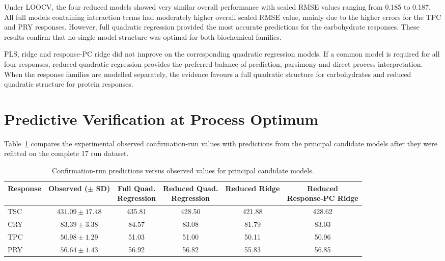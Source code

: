\documentclass[MScDSA]{uccthesis}
\begin{document}
Under LOOCV, the four reduced models showed very similar overall performance with scaled RMSE values ranging from 0.185 to 0.187. All full models containing interaction terms had moderately higher overall scaled RMSE value, mainly due to the higher errors for the TPC and PRY responses. However, full quadratic regression provided the most accurate predictions for the carbohydrate responses. These results confirm that no single model structure was optimal for both biochemical families.

PLS, ridge and response-PC ridge did not improve on the corresponding quadratic regression models. If a common model is required for all four responses, reduced quadratic regression provides the preferred balance of prediction, parsimony and direct process interpretation. When the response families are modelled separately, the evidence favours a full quadratic structure for carbohydrates and reduced quadratic structure for protein responses.

\section{Predictive Verification at Process Optimum}
\label{sec:confirmation_predictions}
Table~\ref{tab:confirmation_predictions} compares the experimental observed confirmation-run values with predictions from the principal candidate models after they were refitted on the complete 17 run dataset.

\begin{table}[H]
\centering
\fontsize{10}{12}\selectfont
\setlength{\tabcolsep}{4pt}
\caption{Confirmation-run predictions versus observed values for principal candidate models.}
\label{tab:confirmation_predictions}
\begin{tabular}{lccccc}
\toprule
\textbf{Response} & \textbf{Observed ($\pm$ SD)} & \makecell{\textbf{Full Quad.}\\\textbf{Regression}} & \makecell{\textbf{Reduced Quad.}\\\textbf{Regression}} & \textbf{Reduced Ridge} & \makecell{\textbf{Reduced}\\\textbf{Response-PC Ridge}} \\
\midrule
TSC & $431.09 \pm 17.48$ & 435.81 & 428.50 & 421.88 & 428.62 \\
CRY & $83.39 \pm 3.38$ & 84.57 & 83.08 & 81.79 & 83.03 \\
TPC & $50.98 \pm 1.29$ & 51.03 & 51.00 & 50.11 & 50.96 \\
PRY & $56.64 \pm 1.43$ & 56.92 & 56.82 & 55.83 & 56.85 \\
\bottomrule
\end{tabular}
\end{table}
\end{document}
